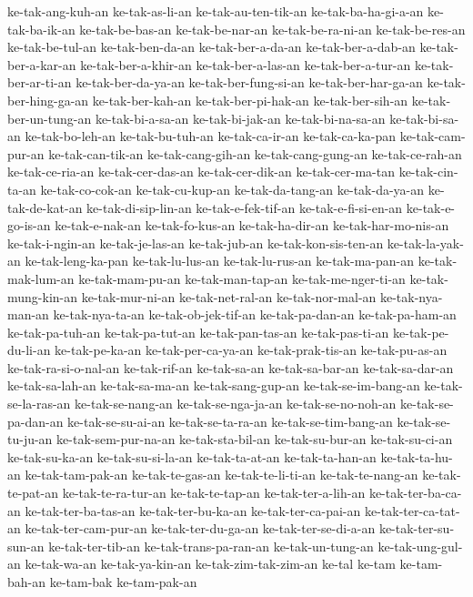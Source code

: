 {ke-tak-ang-kuh-an ke-tak-as-li-an ke-tak-au-ten-tik-an
ke-tak-ba-ha-gi-a-an ke-tak-ba-ik-an ke-tak-be-bas-an ke-tak-be-nar-an
ke-tak-be-ra-ni-an ke-tak-be-res-an ke-tak-be-tul-an ke-tak-ben-da-an
ke-tak-ber-a-da-an ke-tak-ber-a-dab-an ke-tak-ber-a-kar-an
ke-tak-ber-a-khir-an ke-tak-ber-a-las-an ke-tak-ber-a-tur-an
ke-tak-ber-ar-ti-an ke-tak-ber-da-ya-an ke-tak-ber-fung-si-an
ke-tak-ber-har-ga-an ke-tak-ber-hing-ga-an ke-tak-ber-kah-an
ke-tak-ber-pi-hak-an ke-tak-ber-sih-an ke-tak-ber-un-tung-an
ke-tak-bi-a-sa-an ke-tak-bi-jak-an ke-tak-bi-na-sa-an ke-tak-bi-sa-an
ke-tak-bo-leh-an ke-tak-bu-tuh-an ke-tak-ca-ir-an ke-tak-ca-ka-pan
ke-tak-cam-pur-an ke-tak-can-tik-an ke-tak-cang-gih-an ke-tak-cang-gung-an
ke-tak-ce-rah-an ke-tak-ce-ria-an ke-tak-cer-das-an ke-tak-cer-dik-an
ke-tak-cer-ma-tan ke-tak-cin-ta-an ke-tak-co-cok-an ke-tak-cu-kup-an
ke-tak-da-tang-an ke-tak-da-ya-an ke-tak-de-kat-an ke-tak-di-sip-lin-an
ke-tak-e-fek-tif-an ke-tak-e-fi-si-en-an ke-tak-e-go-is-an ke-tak-e-nak-an
ke-tak-fo-kus-an ke-tak-ha-dir-an ke-tak-har-mo-nis-an ke-tak-i-ngin-an
ke-tak-je-las-an ke-tak-jub-an ke-tak-kon-sis-ten-an ke-tak-la-yak-an
ke-tak-leng-ka-pan ke-tak-lu-lus-an ke-tak-lu-rus-an ke-tak-ma-pan-an
ke-tak-mak-lum-an ke-tak-mam-pu-an ke-tak-man-tap-an ke-tak-me-nger-ti-an
ke-tak-mung-kin-an ke-tak-mur-ni-an ke-tak-net-ral-an ke-tak-nor-mal-an
ke-tak-nya-man-an ke-tak-nya-ta-an ke-tak-ob-jek-tif-an ke-tak-pa-dan-an
ke-tak-pa-ham-an ke-tak-pa-tuh-an ke-tak-pa-tut-an ke-tak-pan-tas-an
ke-tak-pas-ti-an ke-tak-pe-du-li-an ke-tak-pe-ka-an ke-tak-per-ca-ya-an
ke-tak-prak-tis-an ke-tak-pu-as-an ke-tak-ra-si-o-nal-an ke-tak-rif-an
ke-tak-sa-an ke-tak-sa-bar-an ke-tak-sa-dar-an ke-tak-sa-lah-an
ke-tak-sa-ma-an ke-tak-sang-gup-an ke-tak-se-im-bang-an
ke-tak-se-la-ras-an ke-tak-se-nang-an ke-tak-se-nga-ja-an
ke-tak-se-no-noh-an ke-tak-se-pa-dan-an ke-tak-se-su-ai-an
ke-tak-se-ta-ra-an ke-tak-se-tim-bang-an ke-tak-se-tu-ju-an
ke-tak-sem-pur-na-an ke-tak-sta-bil-an ke-tak-su-bur-an ke-tak-su-ci-an
ke-tak-su-ka-an ke-tak-su-si-la-an ke-tak-ta-at-an ke-tak-ta-han-an
ke-tak-ta-hu-an ke-tak-tam-pak-an ke-tak-te-gas-an ke-tak-te-li-ti-an
ke-tak-te-nang-an ke-tak-te-pat-an ke-tak-te-ra-tur-an ke-tak-te-tap-an
ke-tak-ter-a-lih-an ke-tak-ter-ba-ca-an ke-tak-ter-ba-tas-an
ke-tak-ter-bu-ka-an ke-tak-ter-ca-pai-an ke-tak-ter-ca-tat-an
ke-tak-ter-cam-pur-an ke-tak-ter-du-ga-an ke-tak-ter-se-di-a-an
ke-tak-ter-su-sun-an ke-tak-ter-tib-an ke-tak-trans-pa-ran-an
ke-tak-un-tung-an ke-tak-ung-gul-an ke-tak-wa-an ke-tak-ya-kin-an
ke-tak-zim-tak-zim-an ke-tal ke-tam ke-tam-bah-an ke-tam-bak ke-tam-pak-an
}
